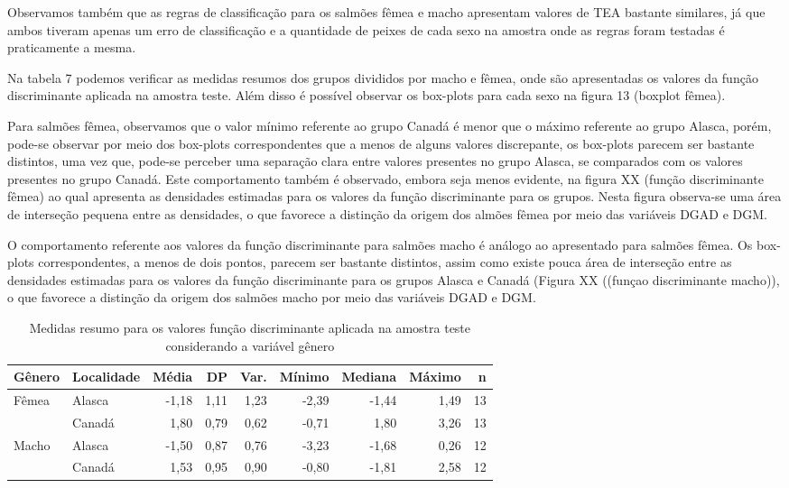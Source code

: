 \documentclass[10pt,portuguese,]{article}
\begin{document}
Observamos também que as regras de classificação para os salmões fêmea e
macho apresentam valores de TEA bastante similares, já que ambos tiveram
apenas um erro de classificação e a quantidade de peixes de cada sexo na
amostra onde as regras foram testadas é praticamente a mesma.

Na tabela 7 podemos verificar as medidas resumos dos grupos divididos
por macho e fêmea, onde são apresentadas os valores da função
discriminante aplicada na amostra teste. Além disso é possível observar
os box-plots para cada sexo na figura 13 (boxplot fêmea).

Para salmões fêmea, observamos que o valor mínimo referente ao grupo
Canadá é menor que o máximo referente ao grupo Alasca, porém, pode-se
observar por meio dos box-plots correspondentes que a menos de alguns
valores discrepante, os box-plots parecem ser bastante distintos, uma
vez que, pode-se perceber uma separação clara entre valores presentes no
grupo Alasca, se comparados com os valores presentes no grupo Canadá.
Este comportamento também é observado, embora seja menos evidente, na
figura XX (função discriminante fêmea) ao qual apresenta as densidades
estimadas para os valores da função discriminante para os grupos. Nesta
figura observa-se uma área de interseção pequena entre as densidades, o
que favorece a distinção da origem dos almões fêmea por meio das
variáveis DGAD e DGM.

O comportamento referente aos valores da função discriminante para
salmões macho é análogo ao apresentado para salmões fêmea. Os box-plots
correspondentes, a menos de dois pontos, parecem ser bastante distintos,
assim como existe pouca área de interseção entre as densidades estimadas
para os valores da função discriminante para os grupos Alasca e Canadá
(Figura XX ((funçao discriminante macho)), o que favorece a distinção da
origem dos salmões macho por meio das variáveis DGAD e DGM.

\begin{table}[!h]
\centering
\caption{Medidas resumo para os valores função discriminante aplicada na amostra teste considerando a variável gênero}
\begin{tabular}{llrrrrrrr}
\hline
Gênero & Localidade & Média & DP & Var. & Mínimo & Mediana & Máximo & n \\
\hline
\hline
\multirow{2}{*}{Fêmea}& Alasca & -1,18 & 1,11 & 1,23 & -2,39 & -1,44 & 1,49 & 13 \\
& Canadá & 1,80 & 0,79 & 0,62 & -0,71 & 1,80 & 3,26 & 13 \\
\hline
\multirow{2}{*}{Macho}& Alasca & -1,50 & 0,87 & 0,76 & -3,23 & -1,68 & 0,26 & 12 \\
& Canadá & 1,53 & 0,95 & 0,90 & -0,80 & -1,81 & 2,58 & 12 \\
\hline
\end{tabular}
\end{table}
\end{document}
